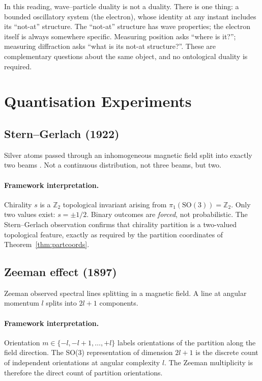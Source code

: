 \documentclass[11pt,a4paper]{article}
\theoremstyle{definition}
\theoremstyle{remark}
\begin{document}
In this reading, wave--particle duality is not a duality. There is one thing: a bounded oscillatory system (the electron), whose identity at any instant includes its ``not-at'' structure. The ``not-at'' structure has wave properties; the electron itself is always somewhere specific. Measuring position asks ``where is it?''; measuring diffraction asks ``what is its not-at structure?''. These are complementary questions about the same object, and no ontological duality is required.

\section{Quantisation Experiments}
\label{sec:quantisation}

\subsection{Stern--Gerlach (1922)}

Silver atoms passed through an inhomogeneous magnetic field split into exactly two beams \citep{sterngerlach1922}. Not a continuous distribution, not three beams, but two.

\paragraph{Framework interpretation.} Chirality $s$ is a $\mathbb{Z}_2$ topological invariant arising from $\pi_1(\mathrm{SO}(3)) = \mathbb{Z}_2$. Only two values exist: $s = \pm 1/2$. Binary outcomes are \emph{forced}, not probabilistic. The Stern--Gerlach observation confirms that chirality partition is a two-valued topological feature, exactly as required by the partition coordinates of Theorem~\ref{thm:partcoords}.

\subsection{Zeeman effect (1897)}

Zeeman \citep{zeeman1897} observed spectral lines splitting in a magnetic field. A line at angular momentum $l$ splits into $2l+1$ components.

\paragraph{Framework interpretation.} Orientation $m \in \{-l, -l+1, \dots, +l\}$ labels orientations of the partition along the field direction. The SO(3) representation of dimension $2l+1$ is the discrete count of independent orientations at angular complexity $l$. The Zeeman multiplicity is therefore the direct count of partition orientations.
\end{document}
